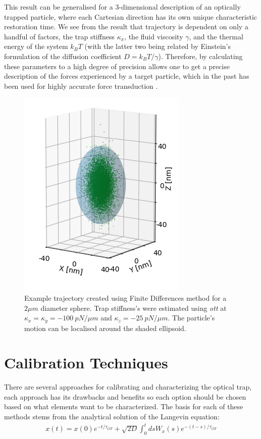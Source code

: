 This result can be generalised for a 3-dimensional description of an 
optically trapped particle, where each Cartesian direction has its 
own unique characteristic restoration time. We see from the result 
that trajectory is dependent on only a handful of factors, the trap 
stiffness $\kappa_x$, the fluid viscosity $\gamma$, and the thermal 
energy of the system $k_BT$ (with the latter two being related by 
Einstein's formulation of the diffusion coefficient $D = k_BT/\gamma$). 
Therefore, by calculating these parameters to a high degree of precision 
allows one to get a precise description of the forces experienced by a 
target particle, which in the past has been used for highly accurate 
force transduction \cite{BergSoerensen2004, Smith2003}.
\begin{figure}[h!]
	\centering
	\includegraphics[width=0.67\linewidth]{finite_differences.png}
	\caption{Example trajectory created using Finite Differences method
			 for a $2\mu m$ diameter sphere. Trap stiffness's were estimated using \textit{ott} at $\kappa_x = \kappa_y = -100\ pN/\mu m$ and $\kappa_z = -25\ pN/\mu m$. The particle's motion can be localised around the shaded ellipsoid.}
\end{figure}

\section{Calibration Techniques}
\label{sec:calibration_techniques}
There are several approaches for calibrating and characterizing the 
optical trap, each approach has its drawbacks and benefits so each 
option should be chosen based on what elements want to be characterized. 
The basis for each of these methods stems from the analytical solution 
of the Langevin equation:
\begin{align}
	\label{eq:anylitical_lang}
	x(t) = x(0)e^{-t/\tau_{OT}}+\sqrt{2D}\int^t_0dsW_x(s)e^{-(t-s)/\tau_{OT}}
\end{align}

